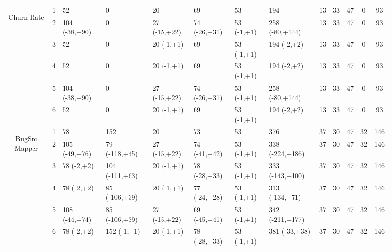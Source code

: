 \begin{figure}
\begin{adjustbox}{max width=\textwidth}
\begin{tabular}{|c|c|l|l|l|l|l|l|c|c|c|c|c|}
\multirow{6}{*}{\begin{sideways}Churn Rate\end{sideways}}  
& 1 & 52 & 0 & 20 & 69 & 53 & 194 & 13 & 33 & 47 & 0 & 93 \\ 

\cline{2-13} & 2 & 104 (-38,+90) & 0 & 27 (-15,+22) & 74 (-26,+31) & 53 (-1,+1)
& 258 (-80,+144) & 13 & 33 & 47 & 0 & 93 \\

\cline{2-13} & 3 & 52 & 0 & 20 (-1,+1) & 69 & 53 (-1,+1) & 194 (-2,+2) & 13 & 33 & 47 & 0 & 93 \\ 

\cline{2-13} & 4 & 52 & 0 & 20 (-1,+1) & 69 & 53 (-1,+1) & 194 (-2,+2) & 13 & 33 & 47 & 0 & 93 \\

\cline{2-13} & 5 & 104 (-38,+90) & 0 & 27 (-15,+22) & 74 (-26,+31) & 53 (-1,+1)
& 258 (-80,+144) & 13 & 33 & 47 & 0 & 93 \\

\cline{2-13} & 6 & 52 & 0 & 20 (-1,+1) & 69 & 53 (-1,+1) & 194 (-2,+2)
& 13 & 33 & 47 & 0 & 93 \\ \hline

\multirow{6}{*}{\begin{sideways}BugSrc Mapper\end{sideways}}
& 1 & 78 & 152 & 20 & 73 & 53 & 376 & 37 & 30 & 47 & 32 & 146 \\ 

\cline{2-13} & 2 & 105 (-49,+76) & 79 (-118,+45) & 27 (-15,+22) & 74 (-41,+42) &
53 (-1,+1) & 338 (-224,+186) & 37 & 30 & 47 & 32 & 146 \\

\cline{2-13} & 3 & 78 (-2,+2) & 104 (-111,+63) & 20 (-1,+1) & 78 (-28,+33) & 53
(-1,+1) & 333 (-143,+100) & 37 & 30 & 47 & 32 & 146 \\

\cline{2-13} & 4 & 78 (-2,+2) & 85 (-106,+39) & 20 (-1,+1) & 77 (-24,+28) & 53
(-1,+1) & 313 (-134,+71) & 37 & 30 & 47 & 32 & 146 \\

\cline{2-13} & 5 & 108 (-44,+74) & 85 (-106,+39) & 27 (-15,+22) & 69 (-45,+41) &
53 (-1,+1) & 342 (-211,+177) & 37 & 30 & 47 & 32 & 146 \\

\cline{2-13} & 6 & 78 (-2,+2) & 152 (-1,+1) & 20 (-1,+1) & 78 (-28,+33) & 53
(-1,+1) & 381 (-33,+38) & 37 & 30 & 47 & 32 & 146 \\
\hline


\end{tabular}
\end{adjustbox}
\end{figure}
